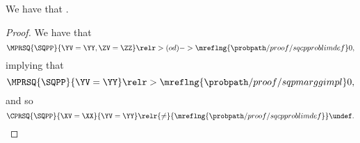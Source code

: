 \begin{proposition}
  We have that \sqpcpproblimdefimplprop.%
\end{proposition}

\begin{proof}
  We have that 
  $$\MPRSQ{\SQPP}{\YV = \YY, \ZV = \ZZ} \relr > {(od)->\mreflng{\probpath/proof/sqcpproblimdef}} 0,$$ 
  implying that
  $$\MPRSQ{\SQPP}{\YV = \YY} \relr > {\mreflng{\probpath/proof/sqpmarggimpl}} 0,$$
  and so
  $$\CPRSQ{\SQPP}{\XV = \XX}{\YV = \YY} \relr {\ne} {\mreflng{\probpath/proof/sqcpproblimdef}} \undef.$$%
\end{proof}
